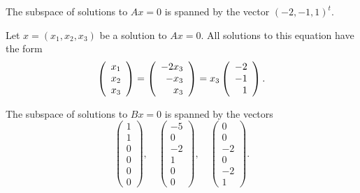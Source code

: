 \ans The subspace of solutions to $Ax = 0$ is spanned by the vector
$(-2,-1,1)^t$.

\soln Let $x = (x_1,x_2,x_3)$ be a solution to $Ax = 0$.  All solutions
to this equation have the form
\[
\left(\begin{array}{r} x_1 \\ x_2 \\ x_3\end{array}\right) = \left(\begin{array}{r} -2x_3 \\ -x_3 \\ x_3\end{array}\right) =
x_3\left(\begin{array}{r} -2 \\ -1 \\ 1\end{array}\right).
\]

\ans The subspace of solutions to $Bx = 0$ is spanned by the vectors
\[
\left(\begin{array}{r} 1 \\ 1 \\ 0 \\ 0 \\ 0 \\ 0 \end{array}\right), \quad
\left(\begin{array}{r} -5 \\ 0 \\ -2 \\ 1 \\ 0 \\ 0 \end{array}\right), \quad
\left(\begin{array}{r} 0 \\ 0 \\ -2 \\ 0 \\ -2 \\ 1 \end{array}\right).
\]


